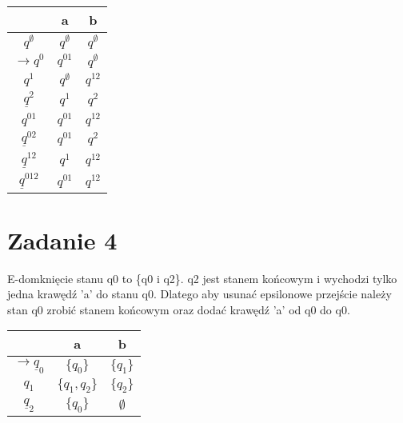 \documentclass{article}
\begin{document}
\vspace{-1.8cm}
\begin{minipage}{.7\linewidth}
\centering
\begin{tabular}{ c | c | c }
  & a & b \\ 
\hline
$q^\emptyset$         & $q^\emptyset$   & $q^\emptyset$ \\  \hline
$\rightarrow q^0$     & $q^{01}$      & $q^\emptyset$ \\  \hline
$q^1$                 & $q^\emptyset$ & $q^{12}$ \\ \hline
$\underline q^2$      & $q^1$         & $q^2$ \\ \hline

$q^{01}$              & $q^{01}$      & $q^{12}$ \\ \hline
$\underline q^{02}$   & $q^{01}$      & $q^2$ \\ \hline
$\underline q^{12}$   & $q^1$         & $q^{12}$ \\ \hline

$\underline q^{012}$  & $q^{01}$      & $q^{12}$ \\ 

\end{tabular}
\end{minipage}


\section*{Zadanie 4}
E-domknięcie stanu q0 to \{q0 i q2\}. q2 jest stanem końcowym i wychodzi tylko jedna krawędź 'a' do stanu q0. Dlatego aby usunać epsilonowe przejście należy stan q0 zrobić stanem końcowym oraz dodać krawędź 'a' od q0 do q0.



\vspace{1cm}
\begin{tabular}{ c | c | c }
  & a & b \\ 
\hline
$\rightarrow \underline q_0$   & $\{q_0\}$       & $\{q_1\}$ \\  \hline
$q_1$                          & $\{q_1 , q_2\}$ & $\{q_2\}$ \\ \hline
$\underline q_2$               & $\{q_0\}$       & $\emptyset$\\ 
\end{tabular}
\end{document}
